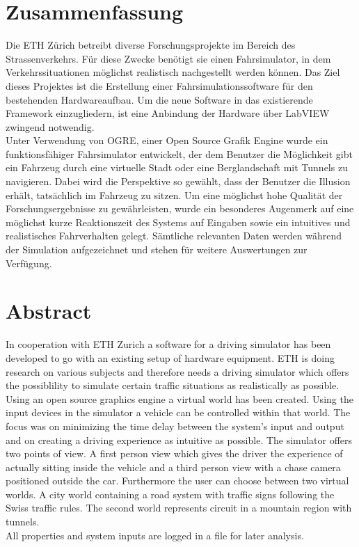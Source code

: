 \section*{Zusammenfassung}
Die ETH Zürich betreibt diverse Forschungsprojekte im Bereich des Strassenverkehrs. Für diese Zwecke benötigt sie einen Fahrsimulator, in dem Verkehrssituationen möglichst realistisch nachgestellt werden können. Das Ziel dieses Projektes ist die Erstellung einer Fahrsimulationssoftware für den bestehenden Hardwareaufbau. Um die neue Software in das existierende Framework einzugliedern, ist eine Anbindung der Hardware über LabVIEW zwingend notwendig.\\
Unter Verwendung von OGRE, einer Open Source Grafik Engine wurde ein funktionsfähiger Fahrsimulator entwickelt, der dem Benutzer die Möglichkeit gibt ein Fahrzeug durch eine virtuelle Stadt oder eine Berglandschaft mit Tunnels zu navigieren. Dabei wird die Perspektive so gewählt, dass der Benutzer die Illusion erhält, tatsächlich im Fahrzeug zu sitzen.
Um eine möglichst hohe Qualität der Forschungsergebnisse zu gewährleisten, wurde ein besonderes Augenmerk auf eine möglichst kurze Reaktionszeit des Systems auf Eingaben sowie ein intuitives und realistisches Fahrverhalten gelegt.
Sämtliche relevanten Daten werden während der Simulation aufgezeichnet und stehen für weitere Auswertungen zur Verfügung.
\newpage
\thispagestyle{empty}
\hspace{1cm}
\newpage
\section*{Abstract}
In cooperation with ETH Zurich a software for a driving simulator has been developed to go with an existing setup of hardware equipment. ETH is doing research on various subjects and therefore needs a driving simulator which offers the possiblility to simulate certain traffic situations as realistically as possible.\\
Using an open source graphics engine a virtual world has been created. Using the input devices in the simulator a vehicle can be controlled within that world. The focus was on minimizing the time delay between the system's input and output and on creating a driving experience as intuitive as possible. The simulator offers two points of view. A first person view which gives the driver the experience of actually sitting inside the vehicle and a third person view with a chase camera positioned outside the car. Furthermore the user can choose between two virtual worlds. A city world containing a road system with traffic signs following the Swiss traffic rules. The second world represents circuit in a mountain region with tunnels.\\
All properties and system inputs are logged in a file for later analysis.
\newpage
\thispagestyle{empty}
\hspace{1cm}
\newpage